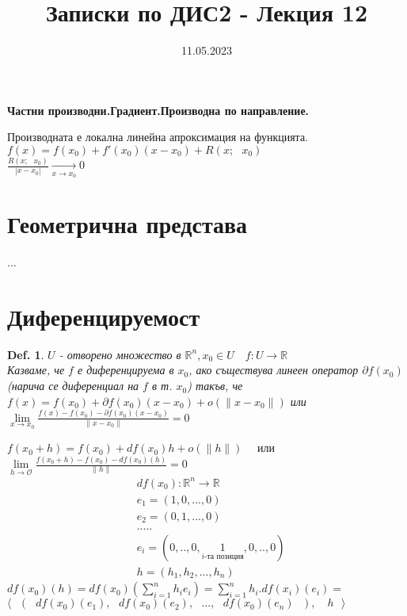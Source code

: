 \documentclass[12pt]{article}
\newtheorem{definition}{Def.}
\newcommand{\spc}{\text{ }}
\begin{document}
	\color{white}
	\pagecolor{darkgray}
	\title{Записки по ДИС2 - Лекция 12}
	\date{11.05.2023}
	\maketitle
	\begin{center}
		\Large
		\textbf{Частни производни.Градиент.Производна по направление.}
	\end{center}
	
	Производната е локална линейна апроксимация на функцията.\\
	$f(x) = f(x_0)+f'(x_0)(x-x_0)+R(x;\spc x_0)$\\
	$\frac{R(x;\spc x_0)}{|x-x_0|}\underset{x\to x_0}{\longrightarrow}0$\\
	
	\section*{Геометрична представа}
	...\\


	
	\section*{Диференцируемост}
	\begin{definition}
		$U$ - отворено множество в $\mathbb{R}^n, x_0\in U\quad f:U\rightarrow\mathbb{R}$\\
		Казваме, че $f$ е диференцируема в $x_0$, ако съществува линеен оператор $\partial f(x_0)$ (нарича се диференциал на $f$ в т. $x_0$) такъв, че \\
		$f(x)=f(x_0)+\partial f(x_0)(x-x_0)+o(\|x-x_0\|)$ или\\
		$\lim\limits_{x\to x_0}\frac{f(x)-f(x_0)-\partial f(x_0)(x-x_0)}{\|x-x_0\|}=0$
	\end{definition}
	$f(x_0 +h) = f(x_0) + df(x_0)h + o(\|h\|)\quad $ или 
	$\lim\limits_{h\to\mathcal{O}}\frac{f(x_0 +h) - f(x_0) - df(x_0)(h)}{\|h\|} = 0$\\
	
	\begin{align*}
		&df(x_0) : \mathbb{R}^n \rightarrow \mathbb{R}\\
		&e_1 = (1,0,...,0)\\
		&e_2 = (0,1,...,0)\\
		&	.....\\
		&e_i = (0,..,0,\underset{i\text{-та позиция}}{1},0,..,0)\\
		&h = (h_1,h_2,...,h_n)
	\end{align*}
	$df(x_0)(h)=df(x_0)\left(\sum_{i=1}^{n}h_i e_i\right) = \sum_{i=1}^{n}h_i . df(x_i)(e_i) = $
	$\big\langle \spc (\spc df(x_0)(e_1),\spc df(x_0)(e_2),\spc...,\spc df(x_0)(e_n)\spc),\quad h\spc\big\rangle$
	
\end{document}
